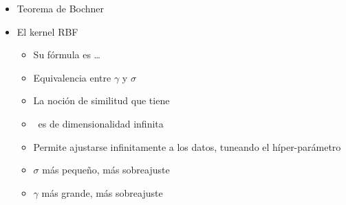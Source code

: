 \begin{note}
  \begin{itemize}
    \item Teorema de Bochner
    \item El kernel RBF
    \begin{itemize}
      \item Su fórmula es \ldots
      \item Equivalencia entre $\gamma$ y $\sigma$
      \item La noción de similitud que tiene
      \item \Hspace\ es de dimensionalidad infinita
      \item Permite ajustarse infinitamente a los datos, tuneando el
      híper-parámetro
      \item $\sigma$ más pequeño, más sobreajuste
      \item $\gamma$ más grande, más sobreajuste
    \end{itemize}
  \end{itemize}
\end{note}

